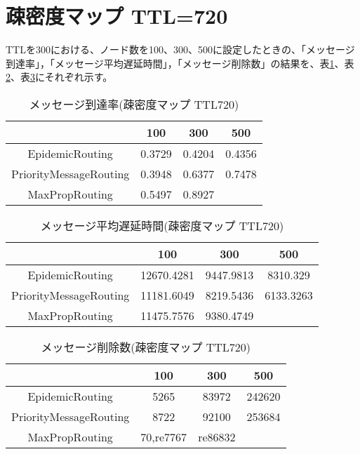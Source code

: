 \documentclass[11pt]{icsthesis}
\begin{document}
\section{疎密度マップ TTL=720}
TTLを300における、ノード数を100、300、500に設定したときの、「メッセージ到達率」，「メッセージ平均遅延時間」，「メッセージ削除数」の結果を、表\ref{somituTtl720deliveryprob}、表\ref{somituTtl720latencyavg}、表\ref{somituTtl720dropped}にそれぞれ示す。
\begin{table}[H]
 \begin{center}
      \caption[]{メッセージ到達率(疎密度マップ TTL720)}
      \label{somituTtl720deliveryprob}
      \begin{tabular}{|c|c|c|c|}
\hline
&100&300&500\\
\hline
EpidemicRouting&0.3729&0.4204&0.4356\\
\hline
PriorityMessageRouting&0.3948&0.6377&0.7478\\
\hline
MaxPropRouting&0.5497&0.8927&\\
\hline
      \end{tabular}
    \end{center}
\end{table}

\begin{table}[H]
 \begin{center}
      \caption[]{メッセージ平均遅延時間(疎密度マップ TTL720)}
      \label{somituTtl720latencyavg}
      \begin{tabular}{|c|c|c|c|}
\hline
&100&300&500\\
\hline
EpidemicRouting&12670.4281&9447.9813&8310.329\\
\hline
PriorityMessageRouting&11181.6049&8219.5436&6133.3263\\
\hline
MaxPropRouting&11475.7576&9380.4749&\\
\hline
      \end{tabular}
    \end{center}
\end{table}

\begin{table}[H]
 \begin{center}
      \caption[]{メッセージ削除数(疎密度マップ TTL720)}
      \label{somituTtl720dropped}
      \begin{tabular}{|c|c|c|c|}
\hline
&100&300&500\\
\hline
EpidemicRouting&5265&83972&242620\\
\hline
PriorityMessageRouting&8722&92100&253684\\
\hline
MaxPropRouting&70,re7767&re86832&\\
\hline
      \end{tabular}
    \end{center}
\end{table}
\end{document}

